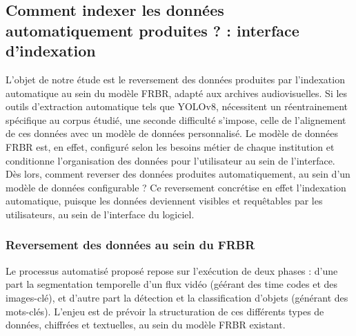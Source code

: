 \subsection{Comment indexer les données automatiquement produites ? : interface d’indexation} 

L’objet de notre étude est le reversement des données produites par l’indexation automatique au sein du modèle FRBR, adapté aux archives audiovisuelles. Si les outils d’extraction automatique tels que YOLOv8, nécessitent un réentrainement spécifique au corpus étudié, une seconde difficulté s'impose, celle de l'alignement de ces données avec un modèle de données personnalisé. Le modèle de données FRBR est, en effet, configuré selon les besoins métier de chaque institution et conditionne l’organisation des données pour l’utilisateur au sein de l’interface. Dès lors, comment reverser des données produites automatiquement, au sein d’un modèle de données configurable ? Ce reversement concrétise en effet l’indexation automatique, puisque les données deviennent visibles et requêtables par les utilisateurs, au sein de l'interface du logiciel. 



\subsubsection{Reversement des données au sein du FRBR} 

Le processus automatisé proposé repose sur l'exécution de deux phases : d'une part la segmentation temporelle d'un flux vidéo (géérant des time codes et des images-clé), et d'autre part la détection et la classification d'objets (générant des mots-clés). L'enjeu est de prévoir la structuration de ces différents types de données, chiffrées et textuelles, au sein du modèle FRBR existant. 


